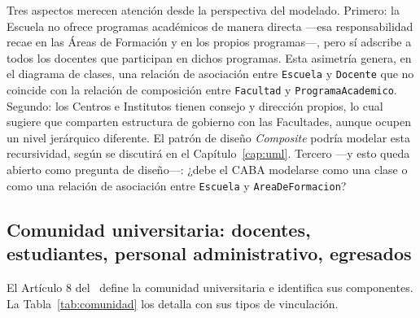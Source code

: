 Tres aspectos merecen atención desde la perspectiva del modelado.
Primero: la Escuela no ofrece programas académicos de manera directa
---esa responsabilidad recae en las Áreas de Formación y en los propios
programas---, pero sí adscribe a todos los docentes que participan en
dichos programas. Esta asimetría genera, en el diagrama de clases, una
relación de asociación entre \texttt{Escuela} y \texttt{Docente} que
no coincide con la relación de composición entre \texttt{Facultad} y
\texttt{ProgramaAcademico}. Segundo: los Centros e Institutos tienen
consejo y dirección propios, lo cual sugiere que comparten estructura
de gobierno con las Facultades, aunque ocupen un nivel jerárquico diferente.
El patrón de diseño \textit{Composite} podría modelar esta recursividad,
según se discutirá en el Capítulo~\ref{cap:uml}. Tercero ---y esto queda
abierto como pregunta de diseño---: ¿debe el CABA modelarse como una clase
o como una relación de asociación entre \texttt{Escuela} y
\texttt{AreaDeFormacion}?

\subsection{Comunidad universitaria: docentes, estudiantes,
  personal administrativo, egresados}
\label{subsec:comunidad-universitaria}

El Artículo 8 del \acuerdo\ define la comunidad universitaria e identifica
sus componentes. La Tabla~\ref{tab:comunidad} los detalla con sus tipos
de vinculación.

